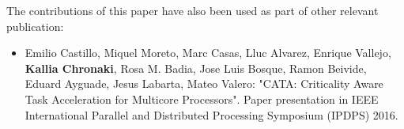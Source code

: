 The contributions of this paper have also been used as part of other relevant publication:
\begin{itemize}
	\item \cite{CATA} Emilio Castillo, Miquel Moreto, Marc Casas, Lluc Alvarez, Enrique Vallejo, \textbf{Kallia Chronaki}, Rosa M. Badia, Jose Luis Bosque, Ramon Beivide, Eduard Ayguade, Jesus Labarta, Mateo Valero: "CATA: Criticality Aware Task Acceleration for Multicore Processors".
	Paper presentation in IEEE International Parallel and Distributed Processing Symposium (IPDPS) 2016.
\end{itemize}
%
%
%
%
%



